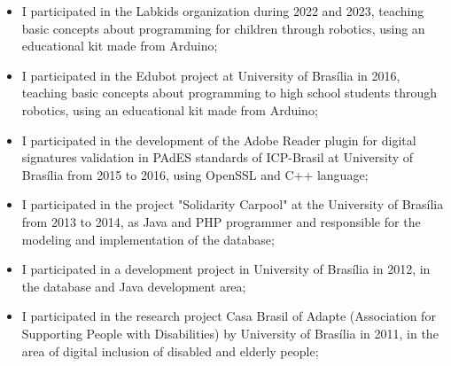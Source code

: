 \begin{itemize}
    \item I participated in the Labkids organization during 2022 and 2023, teaching basic concepts about programming for children through robotics, using an educational kit made from Arduino;
    \item I participated in the Edubot project at University of Brasília in 2016, teaching basic concepts about programming to high school students through robotics, using an educational kit made from Arduino;
    \item I participated in the development of the Adobe Reader plugin for digital signatures validation in PAdES standards of ICP-Brasil at University of Brasília from 2015 to 2016, using OpenSSL and C++ language;
    \item I participated in the project "Solidarity Carpool" at the University of Brasília from 2013 to 2014, as Java and PHP programmer and responsible for the modeling and implementation of the database;
    \item I participated in a development project in University of Brasília in 2012, in the database and Java development area;
    \item I participated in the research project Casa Brasil of Adapte (Association for Supporting People with Disabilities) by University of Brasília in 2011, in the area of digital inclusion of disabled and elderly people;
\end{itemize}